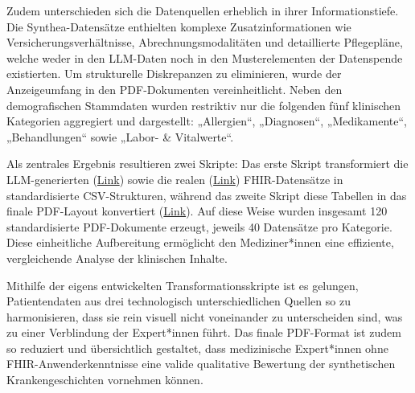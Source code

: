 \begin{description}[style=nextline, font=\bfseries]
    Zudem unterschieden sich die Datenquellen erheblich in ihrer Informationstiefe. Die Synthea-Datensätze enthielten komplexe Zusatzinformationen wie Versicherungsverhältnisse, Abrechnungsmodalitäten und detaillierte Pflegepläne, welche weder in den LLM-Daten noch in den Musterelementen der Datenspende existierten. Um strukturelle Diskrepanzen zu eliminieren, wurde der Anzeigeumfang in den PDF-Dokumenten vereinheitlicht. Neben den demografischen Stammdaten wurden restriktiv nur die folgenden fünf klinischen Kategorien aggregiert und dargestellt: „Allergien“, „Diagnosen“, „Medikamente“, „Behandlungen“ sowie „Labor- \& Vitalwerte“.

    \item[Ergebnisse] 
    Als zentrales Ergebnis resultieren zwei Skripte: Das erste Skript transformiert die LLM-generierten (\href{https://github.com/robinhefner/Research-Project/blob/e212d9b0d35173136eb8706f443504a473cea27e/bewertung_patienten/llm_to_synthea_csv.py}{Link}) sowie die realen (\href{https://github.com/robinhefner/Research-Project/blob/e212d9b0d35173136eb8706f443504a473cea27e/bewertung_patienten/mimic_III_to_synthea_csv.py}{Link}) FHIR-Datensätze in standardisierte CSV-Strukturen, während das zweite Skript diese Tabellen in das finale PDF-Layout konvertiert (\href{https://github.com/robinhefner/Research-Project/blob/e212d9b0d35173136eb8706f443504a473cea27e/bewertung_patienten/synthea_pdf_generator.py}{Link}). Auf diese Weise wurden insgesamt 120 standardisierte PDF-Dokumente erzeugt, jeweils 40 Datensätze pro Kategorie. Diese einheitliche Aufbereitung ermöglicht den Mediziner*innen eine effiziente, vergleichende Analyse der klinischen Inhalte.

    \item[Beantwortung] 
    Mithilfe der eigens entwickelten Transformationsskripte ist es gelungen, Patientendaten aus drei technologisch unterschiedlichen Quellen so zu harmonisieren, dass sie rein visuell nicht voneinander zu unterscheiden sind, was zu einer Verblindung der Expert*innen führt. Das finale PDF-Format ist zudem so reduziert und übersichtlich gestaltet, dass medizinische Expert*innen ohne FHIR-Anwenderkenntnisse eine valide qualitative Bewertung der synthetischen Krankengeschichten vornehmen können.

\end{description}

